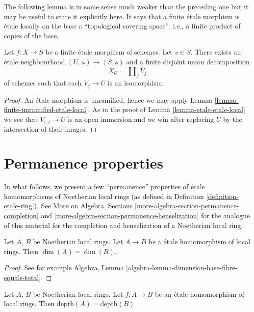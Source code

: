 \noindent
The following lemma is in some sense much weaker than the preceding one
but it may be useful to state it explicitly here. It says that a finite
\'etale morphism is \'etale locally on the base a
``topological covering space'', i.e., a finite product of copies of the base.

\begin{lemma}
\label{lemma-finite-etale-etale-local}
Let $f : X \to S$ be a finite \'etale morphism of schemes.
Let $s \in S$. There exists an \'etale neighbourhood $(U, u) \to (S, s)$
and a finite disjoint union decomposition
$$
X_U = \coprod\nolimits_j V_j
$$
of schemes such that each $V_j \to U$ is an isomorphism.
\end{lemma}

\begin{proof}
An \'etale morphism is unramified, hence we may apply
Lemma \ref{lemma-finite-unramified-etale-local}.
As in the proof of
Lemma \ref{lemma-etale-etale-local}
we see that $V_{i, j} \to U$ is an open immersion and we win
after replacing $U$ by the intersection of their images.
\end{proof}




\section{Permanence properties}
\label{section-properties-permanence}

\noindent
In what follows, we present a few ``permanence''
properties of \'etale homomorphisms of Noetherian local rings
(as defined in Definition \ref{definition-etale-ring}). See
More on Algebra, Sections \ref{more-algebra-section-permanence-completion} and
\ref{more-algebra-section-permanence-henselization}
for the analogue of this material for the completion and
henselization of a Noetherian local ring.

\begin{lemma}
\label{lemma-etale-dimension}
Let $A$, $B$ be Noetherian local rings.
Let $A \to B$ be a \'etale homomorphism of local rings.
Then $\dim(A) = \dim(B)$.
\end{lemma}

\begin{proof}
See for example
Algebra, Lemma \ref{algebra-lemma-dimension-base-fibre-equals-total}.
\end{proof}

\begin{proposition}
\label{proposition-etale-depth}
Let $A$, $B$ be Noetherian local rings.
Let $f : A \to B$ be an \'etale homomorphism of local rings.
Then $\text{depth}(A) = \text{depth}(B)$
\end{proposition}


